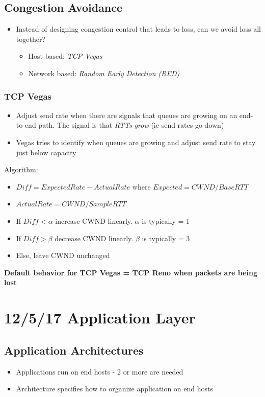 \documentclass[11pt]{article}
\begin{document}
\subsection{Congestion Avoidance}
\label{sec:orgheadline143}
\begin{itemize}
\item Instead of designing congestion control that leads to loss, can we
avoid loss all together?
\begin{itemize}
\item Host based: \emph{TCP Vegas}
\item Network based: \emph{Random Early Detection (RED)}
\end{itemize}
\end{itemize}

\subsubsection{TCP Vegas}
\label{sec:orgheadline142}
\begin{itemize}
\item Adjust send rate when there are signals that queues are growing on
an end-to-end path. The signal is that \emph{RTTs grow} (ie send rates go
down)
\item Vegas tries to identify when queues are growing and adjust send rate
to stay just below capacity
\end{itemize}

\uline{Algorithm:}
\begin{itemize}
\item \(Diff = ExpectedRate - ActualRate\) where \(Expected =
  CWND/BaseRTT\)
\item \(ActualRate = CWND/SampleRTT\)
\item If \(Diff < \alpha\) increase CWND linearly. \(\alpha\) is typically = 1
\item If \(Diff > \beta\) decrease CWND linearly. \(\beta\) is typically = 3
\item Else, leave CWND unchanged
\end{itemize}
\textbf{Default behavior for TCP Vegas = TCP Reno when packets are being
lost}

\section{12/5/17 Application Layer}
\label{sec:orgheadline153}

\subsection{Application Architectures}
\label{sec:orgheadline145}
\begin{itemize}
\item Applications run on end hosts - 2 or more are needed
\item Architecture specifies how to organize application on end hosts
\end{itemize}
\end{document}
